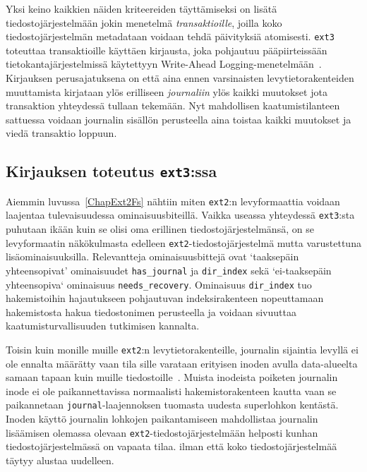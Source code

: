 Yksi keino kaikkien näiden kriteereiden täyttämiseksi on lisätä tiedostojärjestelmään jokin menetelmä \emph{transaktioille},
joilla koko tiedostojärjestelmän metadataan voidaan tehdä päivityksiä atomisesti.
\texttt{ext3} toteuttaa transaktioille käyttäen kirjausta,
joka pohjautuu pääpiirteissään tietokantajärjestelmissä käytettyyn Write-Ahead Logging-menetelmään~\cite{AriesWal}.
Kirjauksen perusajatuksena on että aina ennen varsinaisten levytietorakenteiden muuttamista kirjataan ylös erilliseen \emph{journaliin} ylös kaikki muutokset jota transaktion yhteydessä tullaan tekemään.
Nyt mahdollisen kaatumistilanteen sattuessa voidaan journalin sisällön perusteella aina toistaa kaikki muutokset ja viedä transaktio loppuun.

%

\subsection{Kirjauksen toteutus \texttt{ext3}:ssa}
Aiemmin luvussa~\ref{ChapExt2Fs} nähtiin miten \texttt{ext2}:n levyformaattia voidaan laajentaa tulevaisuudessa ominaisuusbiteillä.
Vaikka useassa yhteydessä \texttt{ext3}:sta puhutaan ikään kuin se olisi oma erillinen tiedostojärjestelmänsä,
on se levyformaatin näkökulmasta edelleen \texttt{ext2}-tiedostojärjestelmä mutta varustettuna lisäominaisuuksilla.
Relevantteja ominaisuusbittejä ovat `taaksepäin yhteensopivat' ominaisuudet \texttt{has\_journal} ja \texttt{dir\_index} sekä `ei-taaksepäin yhteensopiva` ominaisuus \texttt{needs\_recovery}.
Ominaisuus \texttt{dir\_index} tuo hakemistoihin hajautukseen pohjautuvan indeksirakenteen nopeuttamaan hakemistosta hakua tiedostonimen perusteella ja voidaan sivuuttaa kaatumisturvallisuuden tutkimisen kannalta.

Toisin kuin monille muille \texttt{ext2}:n levytietorakenteille, journalin sijaintia levyllä ei ole ennalta määrätty vaan tila sille varataan erityisen inoden avulla data-alueelta samaan tapaan kuin muille tiedostoille~\cite{Ext2Journal}.
Muista inodeista poiketen journalin inode ei ole paikannettavissa normaalisti hakemistorakenteen kautta vaan se paikannetaan \texttt{journal}-laajennoksen tuomasta uudesta superlohkon kentästä.
Inoden käyttö journalin lohkojen paikantamiseen mahdollistaa journalin lisäämisen olemassa olevaan \texttt{ext2}-tiedostojärjestelmään helposti kunhan tiedostojärjestelmässä on vapaata tilaa.
ilman että koko tiedostojärjestelmää täytyy alustaa uudelleen.

